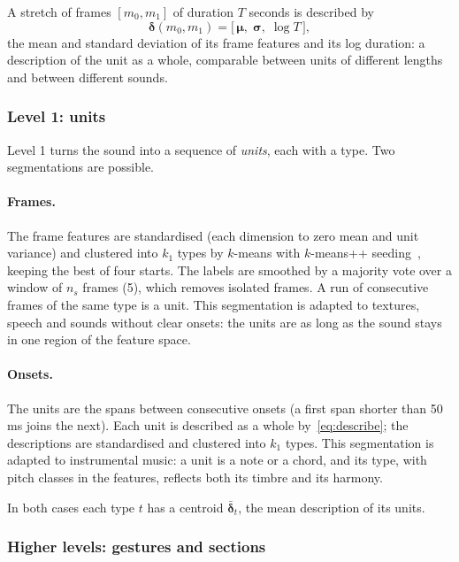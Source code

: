 \documentclass[11pt,a4paper]{article}
\begin{document}
A stretch of frames $[m_0, m_1]$ of duration $T$ seconds is described by
\begin{equation}
  \bm{\delta}(m_0, m_1) = \bigl[\, \bm{\mu},\; \bm{\sigma},\; \log T \,\bigr],
  \label{eq:describe}
\end{equation}
the mean and standard deviation of its frame features and its log duration:
a description of the unit as a whole, comparable between units of different
lengths and between different sounds.

\subsubsection{Level 1: units}

Level 1 turns the sound into a sequence of \emph{units}, each with a type.
Two segmentations are possible.

\paragraph{Frames.} The frame features are standardised (each dimension to
zero mean and unit variance) and clustered into $k_1$ types by $k$-means
with $k$-means++ seeding~\cite{arthur2007}, keeping the best of four
starts. The labels are smoothed by a majority vote over a window of
$n_s$ frames (5), which removes isolated frames. A run of consecutive frames
of the same type is a unit. This segmentation is adapted to textures,
speech and sounds without clear onsets: the units are as long as the sound
stays in one region of the feature space.

\paragraph{Onsets.} The units are the spans between consecutive onsets
(a first span shorter than 50\,ms joins the next). Each unit is described as
a whole by~\eqref{eq:describe}; the descriptions are standardised and
clustered into $k_1$ types. This segmentation is adapted to instrumental
music: a unit is a note or a chord, and its type, with pitch classes in the
features, reflects both its timbre and its harmony.

In both cases each type $t$ has a centroid $\bar{\bm{\delta}}_t$, the mean
description of its units.

\subsubsection{Higher levels: gestures and sections}
\end{document}
